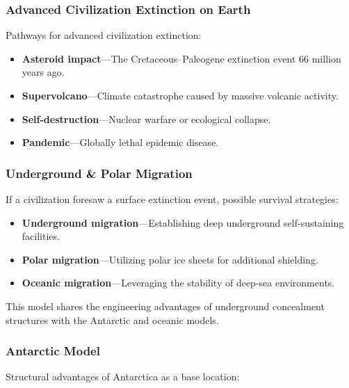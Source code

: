 \documentclass[aps,prd,twocolumn,superscriptaddress,nofootinbib]{revtex4-2}
\begin{document}
\subsubsection{Advanced Civilization Extinction on Earth}\label{sec:earth-extinction}

Pathways for advanced civilization extinction:

\begin{itemize}
  \item \textbf{Asteroid impact}---The Cretaceous--Paleogene extinction event 66 million years ago.
  \item \textbf{Supervolcano}---Climate catastrophe caused by massive volcanic activity.
  \item \textbf{Self-destruction}---Nuclear warfare or ecological collapse.
  \item \textbf{Pandemic}---Globally lethal epidemic disease.
\end{itemize}

\subsubsection{Underground \& Polar Migration}\label{sec:underground-polar}

If a civilization foresaw a surface extinction event, possible survival strategies:

\begin{itemize}
  \item \textbf{Underground migration}---Establishing deep underground self-sustaining facilities.
  \item \textbf{Polar migration}---Utilizing polar ice sheets for additional shielding.
  \item \textbf{Oceanic migration}---Leveraging the stability of deep-sea environments.
\end{itemize}

This model shares the engineering advantages of underground concealment structures with the Antarctic and oceanic models.

\subsubsection{Antarctic Model}\label{sec:antarctic}

Structural advantages of Antarctica as a base location:
\end{document}
